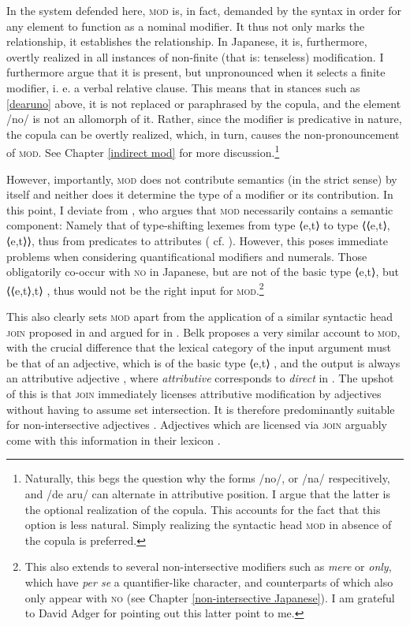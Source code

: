 \documentclass [output=book,colorlinks,citecolor=brown]{langscibook}
\begin{document}
In the system defended here, \textsc{mod} is, in fact, demanded by the syntax in order for any element to function as a nominal modifier. It thus not only marks the relationship, it establishes the relationship. In Japanese, it is, furthermore, overtly realized in all instances of non-finite (that is: tenseless) modification. I furthermore argue that it is present, but unpronounced when it selects a finite modifier, i. e. a verbal relative clause. This means that in stances such as \ref{dearuno} above, it is not replaced or paraphrased by the copula, and the element /no/ is not an allomorph of it. Rather, since the modifier is predicative in nature, the copula can be overtly realized, which, in turn, causes the non-pronouncement of \textsc{mod}. See Chapter \ref{indirect mod} for more discussion.\footnote{Naturally, this begs the question why the forms /no/, or /na/ respecitively, and /de aru/ can alternate in attributive position. I argue that the latter is the optional realization of the copula. This accounts for the fact that this option is less natural. Simply realizing the syntactic head \textsc{mod} in absence of the copula is preferred.}

However, importantly, \textsc{mod} does not contribute semantics (in the strict sense) by itself and neither does it determine the type of a modifier or its contribution. In this point, I deviate from \citet{rubin:1994:mod}, who argues that \textsc{mod} necessarily contains a semantic component: Namely that of type-shifting lexemes from type ⟨e,t⟩ to type ⟨⟨e,t⟩,⟨e,t⟩⟩, thus from predicates to attributes (\citealt[171–177]{rubin:1994:mod} cf. \citealt{partee:1986:noun}). However, this poses immediate problems when considering quantificational modifiers and numerals. Those obligatorily co-occur with \textsc{no} in Japanese, but are not of the basic type ⟨e,t⟩, but ⟨⟨e,t⟩,t⟩ \citep{partee:1986:noun}, thus would not be the right input for \textsc{mod}.\footnote{This also extends to several non-intersective modifiers such as \textit{mere} or \textit{only}, which have \textit{per se} a quantifier-like character, and counterparts of which also only appear with \textsc{no} (see Chapter \ref{non-intersective Japanese}). I am grateful to David Adger for pointing out this latter point to me.}

This also clearly sets \textsc{mod} apart from the application of a similar syntactic head \textsc{join} proposed in \citet{truswell:2004:attributive, truswell:2009:attributive} and argued for in \citet{belk:2017:attributes}. Belk proposes a very similar account to \textsc{mod}, with the crucial difference that the lexical category of the input argument must be that of an adjective, which is of the basic type ⟨e,t⟩ \citep{partee:1986:noun}, and the output is always an attributive adjective \citep[ch. 2.3]{belk:2017:attributes}, where \textit{attributive} corresponds to \textit{direct} in \citet{cinque:2010:adj}. The upshot of this is that \textsc{join} immediately licenses attributive modification by adjectives without having to assume set intersection. It is therefore predominantly suitable for non-intersective adjectives \citep[37–38]{truswell:2004:attributive}. Adjectives which are licensed via \textsc{join} arguably come with this information in their lexicon \citep[157]{belk:2017:attributes}.
\end{document}
